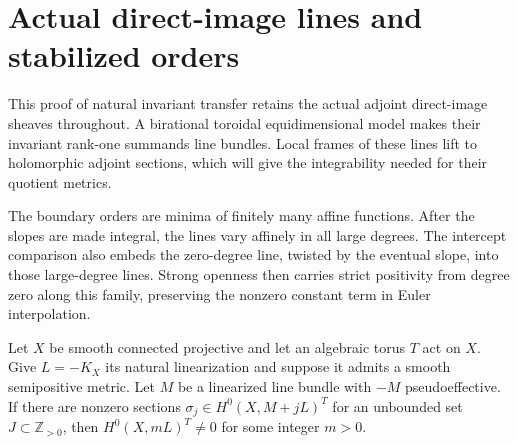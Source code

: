 \section{Actual direct-image lines and stabilized orders}
\label{inj:stabilized}

This proof of natural invariant transfer retains the actual adjoint
direct-image sheaves throughout. A birational toroidal equidimensional
model makes their invariant rank-one summands line bundles. Local
frames of these lines lift to holomorphic adjoint sections, which will
give the integrability needed for their quotient metrics.

The boundary orders are minima of finitely many affine functions.
After the slopes are made integral, the lines vary affinely in all
large degrees. The intercept comparison also embeds the zero-degree
line, twisted by the eventual slope, into those large-degree lines.
Strong openness then carries strict positivity from degree zero along
this family, preserving the nonzero constant term in Euler interpolation.

\begin{proposition}
\label{inj:stabilized-transfer}
Let $X$ be smooth connected projective and let an algebraic torus
$T$ act on $X$.  Give $L=-K_X$ its natural linearization and suppose
it admits a smooth semipositive metric.  Let $M$ be a linearized
line bundle with $-M$ pseudoeffective.  If there are nonzero
sections $\sigma_j\in H^0(X,M+jL)^T$ for an unbounded set
$J\subset\mathbb Z_{>0}$, then $H^0(X,mL)^T\ne0$ for some
integer $m>0$.
\end{proposition}


